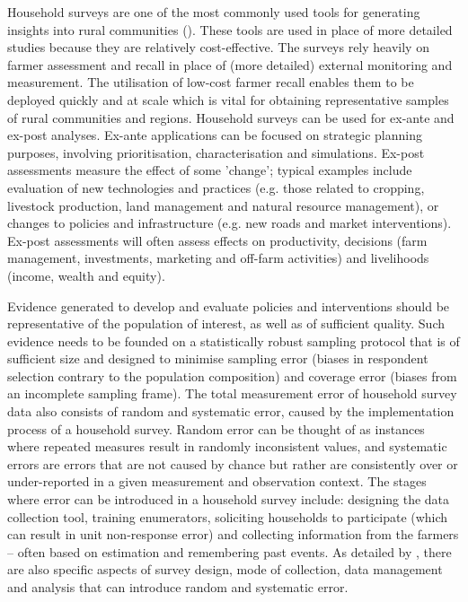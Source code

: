 Household surveys are one of the most commonly used tools for generating insights into rural communities (\citealp{Christiaensen2017}). These tools are used in place of more detailed studies because they are relatively cost-effective. The surveys rely heavily on farmer assessment and recall in place of (more detailed) external monitoring and measurement. The utilisation of low-cost farmer recall enables them to be deployed quickly and at scale which is vital for obtaining representative samples of rural communities and regions. Household surveys can be used for ex-ante and ex-post analyses. Ex-ante applications can be focused on strategic planning purposes, involving prioritisation, characterisation and simulations. Ex-post assessments measure the effect of some 'change'; typical examples include evaluation of new technologies and practices (e.g. those related to cropping, livestock production, land management and natural resource management), or changes to policies and infrastructure (e.g. new roads and market interventions). Ex-post assessments will often assess effects on productivity, decisions (farm management, investments, marketing and off-farm activities) and livelihoods (income, wealth and equity).

Evidence generated to develop and evaluate policies and interventions should be representative of the population of interest, as well as of sufficient quality. Such evidence needs to be founded on a statistically robust sampling protocol that is of sufficient size and designed to minimise sampling error (biases in respondent selection contrary to the population composition) and coverage error (biases from an incomplete sampling frame). The total measurement error of household survey data also consists of random and systematic error, caused by the implementation process of a household survey. Random error can be thought of as instances where repeated measures result in randomly inconsistent values, and systematic errors are errors that are not caused by chance but rather are consistently over or under-reported in a given measurement and observation context. The stages where error can be introduced in a household survey include: designing the data collection tool, training enumerators, soliciting households to participate (which can result in unit non-response error) and collecting information from the farmers -- often based on estimation and remembering past events. As detailed by \citet{Weisburg2005}, there are also specific aspects of survey design, mode of collection, data management and analysis that can introduce random and systematic error.

